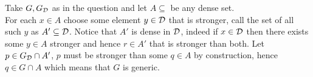 \sub{}
	Take $G,G_{\cal D}$ as in the question and let $A\subseteq$ be any dense set.\\
	For each $x\in A$ choose some element $y\in\cal D$ that is stronger, call the set of all such $y$ as $A'\subseteq \cal D$. Notice that $A'$ is dense in $\cal D$, indeed if $x\in \cal D$ then there exists some $y\in A$ stronger and hence $r\in A'$ that is stronger than both. Let $p\in G_\cal{D}\cap A'$, $p$ must be stronger than some $q\in A$ by construction, hence $q\in G\cap A$ which means that $G$ is generic.
	





